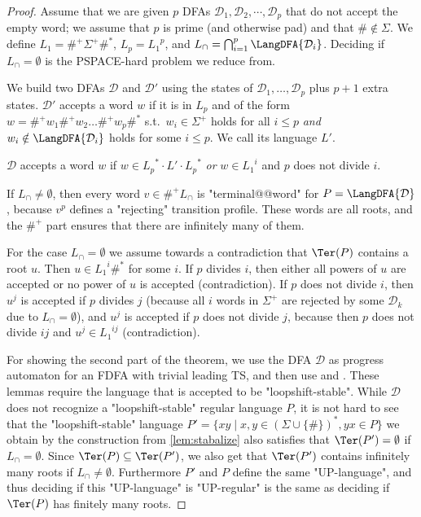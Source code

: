 \documentclass[a4paper,USenglish,cleveref,autoref,thm-restate]{lipics-v2021}
\newcommand{\mc}[1]{\ensuremath{\mathcal{#1}}}
\newcommand{\D}{\mc{D}}
\newcommand{\PSPACE}{\textsf{PSPACE}\xspace}
\begin{document}
\begin{proof}
  Assume that we are given $p$ DFAs $\D_1, \D_2, \cdots, \D_p$ that do not accept the empty word; we assume that $p$ is prime (and otherwise pad) and that $\#\notin \Sigma$.
  We define $L_1=\#^+\Sigma^+\#^*$, $L_p={L_1}^p$, and $L_\cap = \bigcap_{i=1}^p \LangDFA{\D_i}$.
  Deciding if $L_\cap = \emptyset$ is the \PSPACE-hard problem we reduce from.

  We build two DFAs $\D$ and $\D'$ using the states of $\D_1,\ldots,\D_p$ plus $p+1$ extra states.
  $\D'$ accepts a word $w$ if it is in $L_p$ and of the form $w=\#^+w_1\#^+w_2\ldots\#^+w_p\#^*$ s.t.\ $w_i\in \Sigma^+$ holds for all $i \leq p$ \emph{and} $w_i \notin \LangDFA{\D_i}$ holds for some $i\leq p$. We call its language $L'$.

  $\D$ accepts a word $w$ if $w\in {L_p}^*\cdot L'\cdot {L_p}^*$ \emph{or} $w \in {L_1}^i$ and $p$ does not divide $i$.


  If $L_\cap \not= \emptyset$, then every word $v\in \#^+L_\cap$ is "terminal@@word" for $P=\LangDFA{\D}$, because $v^p$ defines a "rejecting" transition profile.
  These words are all roots, and the $\#^+$ part ensures that there are infinitely many of them.

  For the case $L_\cap = \emptyset$ we assume towards a contradiction that $\Ter(P)$ contains a root $u$. Then $u \in {L_1}^i\#^*$ for some $i$.
  If $p$ divides $i$, then either all powers of $u$ are accepted or no power of $u$ is accepted (contradiction). If $p$ does not divide $i$, then $u^j$ is accepted if $p$ divides $j$ (because all $i$ words in $\Sigma^+$ are rejected by some $\D_k$ due to $L_\cap = \emptyset$), and $u^j$ is accepted if $p$ does not divide $j$, because then $p$ does not divide $ij$ and $u^j \in {L_1}^{ij}$ (contradiction).

  For showing the second part of the theorem, we use the DFA $\D$ as progress automaton for an FDFA with trivial leading TS, and then use  and . These lemmas require the language that is accepted to be "loopshift-stable". While $\D$ does not recognize a "loopshift-stable" regular language $P$, it is not hard to see that the "loopshift-stable" language $P' = \{xy \mid x,y \in (\Sigma\cup\{\#\})^*, yx \in P\}$ we obtain by the construction from \cref{lem:stabalize} also satisfies that $\Ter(P')=\emptyset$ if $L_\cap = \emptyset$. Since $\Ter(P) \subseteq \Ter(P')$, we also get that $\Ter(P')$ contains infinitely many roots if $L_\cap \not= \emptyset$.
Furthermore $P'$ and $P$ define the same "UP-language", and thus deciding if this "UP-language" is "UP-regular" is the same as deciding if $\Ter(P)$ has finitely many roots.
\end{proof}
\end{document}
